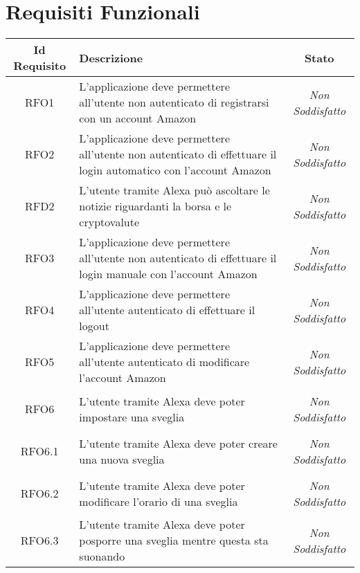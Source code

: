 \section{Requisiti Funzionali}
\normalsize
\begin{longtable}{|c|>{\centering}m{7cm}|c|}
	\hline
	\textbf{Id Requisito} & \textbf{Descrizione} & \textbf{Stato}\\
	\hline
	\endhead
	\hypertarget{RFO1}{RFO1} & L'applicazione deve permettere all'utente non autenticato di registrarsi con un account Amazon & {\textit{Non Soddisfatto}}\\ \hline
	
	\hypertarget{RFO2}{RFO2} & L'applicazione deve permettere all'utente non autenticato di effettuare il login automatico con l'account Amazon & {\textit{Non Soddisfatto}}\\ \hline
	
	\hypertarget{RFD2}{RFD2} & L'utente tramite Alexa può ascoltare le notizie riguardanti la borsa e le cryptovalute & {\textit{Non Soddisfatto}}\\ \hline
	
	\hypertarget{RFO3}{RFO3} & L'applicazione deve permettere all'utente non autenticato di effettuare il login manuale con l'account Amazon & {\textit{Non Soddisfatto}}\\ \hline
	
	\hypertarget{RFO4}{RFO4} & L'applicazione deve permettere all'utente autenticato di effettuare il logout & {\textit{Non Soddisfatto}}\\ \hline
	
	\hypertarget{RFO5}{RFO5} & L'applicazione deve permettere all'utente autenticato di modificare l'account Amazon & {\textit{Non Soddisfatto}}\\ \hline
	
	\hypertarget{RFO6}{RFO6} & L'utente tramite Alexa deve poter impostare una sveglia & {\textit{Non Soddisfatto}}\\ \hline
	
	\hypertarget{RFO6.1}{RFO6.1} & L'utente tramite Alexa deve poter creare una nuova sveglia & {\textit{Non Soddisfatto}}\\ \hline
	
	\hypertarget{RFO6.2}{RFO6.2} & L'utente tramite Alexa deve poter modificare l'orario di una sveglia & {\textit{Non Soddisfatto}}\\ \hline
	
	\hypertarget{RFO6.3}{RFO6.3} & L'utente tramite Alexa deve poter posporre una sveglia mentre questa sta suonando & {\textit{Non Soddisfatto}}\\ \hline
	

\end{longtable}
